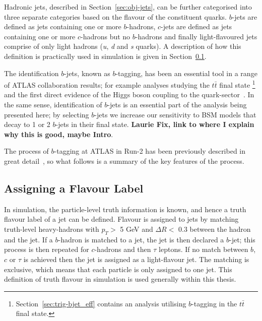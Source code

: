 Hadronic jets, described in Section~\ref{sec:obj-jets}, can be further categorised into three separate categories based on the flavour of the constituent quarks.
$b$-jets are defined as jets containing one or more $b$-hadrons,
$c$-jets are defined as jets containing one or more $c$-hadrons but no $b$-hadrons
and finally light-flavoured jets comprise of only light hadrons (\textit{u}, \textit{d} and \textit{s} quarks).
A description of how this definition is practically used in simulation is given in Section~\ref{sec:obj-bjets_label}.

The identification $b$-jets, known as $b$-tagging, has been an essential tool in a range of ATLAS collaboration results;
for example analyses studying the $t\bar{t}$ final state \cite{obj-ttbar}
\footnote{Section~\ref{sec:trig-bjet_eff} contains an analysis utilising $b$-tagging in the $t\bar{t}$ final state.}
and the first direct evidence of the Higgs boson coupling to the quark-sector~\cite{obj-Hbb}.
In the same sense, identification of $b$-jets is an essential part of the analysis being presented here;
by selecting $b$-jets we increase our sensitivity to BSM models that decay to 1 or 2 $b$-jets in their final state.
\textbf{Laurie Fix, link to where I explain why this is good, maybe Intro}.

The process of $b$-tagging at ATLAS in Run-2 has been previously described in great
detail~\cite{obj-bjets_algo_2015,obj-bjets_algo_2016},
so what follows is a summary of the key features of the process.

\subsection{Assigning a Flavour Label}
\label{sec:obj-bjets_label}

In simulation, the particle-level truth information is known, and hence a truth flavour label of a jet can be defined.
Flavour is assigned to jets by matching truth-level heavy-hadrons with $p_{T} >$ 5 GeV and $\Delta R <$ 0.3 between the hadron and the jet.
If a $b$-hadron is matched to a jet, the jet is then declared a $b$-jet;
this process is then repeated for $c$-hadrons and then $\tau$ leptons.
If no match between $b$, $c$ or $\tau$ is achieved then the jet is assigned as a light-flavour jet.
The matching is exclusive, which means that each particle is only assigned to one jet.
This definition of truth flavour in simulation is used generally within this thesis.
   
